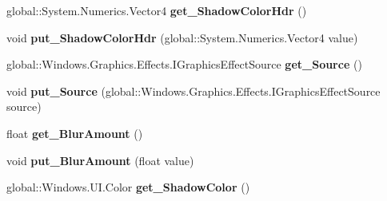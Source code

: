 \begin{DoxyCompactItemize}
global\+::\+System.\+Numerics.\+Vector4 {\bfseries get\+\_\+\+Shadow\+Color\+Hdr} ()
\item 
\mbox{\label{interface_microsoft_1_1_graphics_1_1_canvas_1_1_effects_1_1_i_shadow_effect_ae97d7959236ba2f08e531718a11a4983}} 
void {\bfseries put\+\_\+\+Shadow\+Color\+Hdr} (global\+::\+System.\+Numerics.\+Vector4 value)
\item 
\mbox{\label{interface_microsoft_1_1_graphics_1_1_canvas_1_1_effects_1_1_i_shadow_effect_a344919ac690c7502e2a1c28ee4f5966f}} 
global\+::\+Windows.\+Graphics.\+Effects.\+I\+Graphics\+Effect\+Source {\bfseries get\+\_\+\+Source} ()
\item 
\mbox{\label{interface_microsoft_1_1_graphics_1_1_canvas_1_1_effects_1_1_i_shadow_effect_acea577b60a4e50cef4fea7cdea1764f9}} 
void {\bfseries put\+\_\+\+Source} (global\+::\+Windows.\+Graphics.\+Effects.\+I\+Graphics\+Effect\+Source source)
\item 
\mbox{\label{interface_microsoft_1_1_graphics_1_1_canvas_1_1_effects_1_1_i_shadow_effect_a49b43e4fdcdcf0af12d8a5e4005a11e8}} 
float {\bfseries get\+\_\+\+Blur\+Amount} ()
\item 
\mbox{\label{interface_microsoft_1_1_graphics_1_1_canvas_1_1_effects_1_1_i_shadow_effect_a9d0a51d4856757395eab29060b840a88}} 
void {\bfseries put\+\_\+\+Blur\+Amount} (float value)
\item 
\mbox{\label{interface_microsoft_1_1_graphics_1_1_canvas_1_1_effects_1_1_i_shadow_effect_adcb13593e07a265b7d02f8cc8a31445a}} 
global\+::\+Windows.\+U\+I.\+Color {\bfseries get\+\_\+\+Shadow\+Color} ()
\item 
\mbox{\label{interface_microsoft_1_1_graphics_1_1_canvas_1_1_effects_1_1_i_shadow_effect_aa05abfa69f066a62740ff1025d57fd9c}} 

\end{DoxyCompactItemize}
